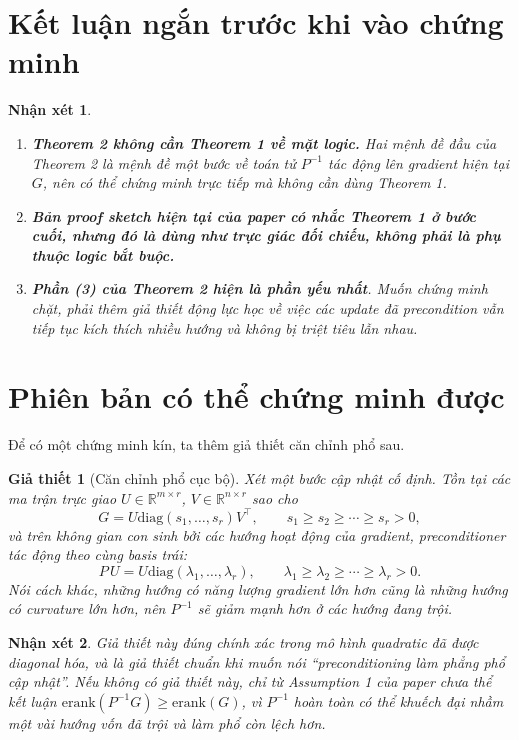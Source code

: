 \documentclass[11pt,a4paper]{article}
\newtheorem{remark}{Nhận xét}
\newtheorem{assumption}{Giả thiết}
\newcommand{\erank}{\mathrm{erank}}
\newcommand{\diag}{\mathrm{diag}}
\newcommand{\RR}{\mathbb{R}}
\begin{document}
\section*{Kết luận ngắn trước khi vào chứng minh}
\begin{remark}
\leavevmode
\begin{enumerate}[nosep]
    \item \textbf{Theorem 2 không cần Theorem 1 về mặt logic.} Hai mệnh đề đầu của Theorem 2 là mệnh đề \emph{một bước} về toán tử $P^{-1}$ tác động lên gradient hiện tại $G$, nên có thể chứng minh trực tiếp mà không cần dùng Theorem 1.
    \item \textbf{Bản proof sketch hiện tại của paper có nhắc Theorem 1 ở bước cuối, nhưng đó là dùng như trực giác đối chiếu, không phải là phụ thuộc logic bắt buộc.}
    \item \textbf{Phần (3) của Theorem 2 hiện là phần yếu nhất}. Muốn chứng minh chặt, phải thêm giả thiết động lực học về việc các update đã precondition vẫn tiếp tục kích thích nhiều hướng và không bị triệt tiêu lẫn nhau.
\end{enumerate}
\end{remark}

\section*{Phiên bản có thể chứng minh được}
Để có một chứng minh kín, ta thêm giả thiết căn chỉnh phổ sau.

\begin{assumption}[Căn chỉnh phổ cục bộ]
\label{ass:alignment}
Xét một bước cập nhật cố định. Tồn tại các ma trận trực giao $U\in\RR^{m\times r}$, $V\in\RR^{n\times r}$ sao cho
\[
G = U \diag(s_1,\dots,s_r)V^\top,\qquad s_1\ge s_2\ge \cdots\ge s_r>0,
\]
và trên không gian con sinh bởi các hướng hoạt động của gradient, preconditioner tác động theo cùng basis trái:
\[
P\,U = U\diag(\lambda_1,\dots,\lambda_r),\qquad \lambda_1\ge \lambda_2\ge \cdots\ge \lambda_r>0.
\]
Nói cách khác, những hướng có năng lượng gradient lớn hơn cũng là những hướng có curvature lớn hơn, nên $P^{-1}$ sẽ giảm mạnh hơn ở các hướng đang trội.
\end{assumption}

\begin{remark}
Giả thiết này đúng chính xác trong mô hình quadratic đã được diagonal hóa, và là giả thiết chuẩn khi muốn nói ``preconditioning làm phẳng phổ cập nhật''. Nếu không có giả thiết này, chỉ từ Assumption 1 của paper chưa thể kết luận $\erank(P^{-1}G)\ge \erank(G)$, vì $P^{-1}$ hoàn toàn có thể khuếch đại nhầm một vài hướng vốn đã trội và làm phổ còn lệch hơn.
\end{remark}
\end{document}
